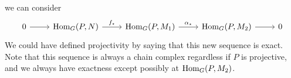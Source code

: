 we can consider
\[\begin{tikzcd}
	0 & {\Hom_G(P, N)} & {\Hom_G(P, M_1)} & {\Hom_G(P, M_2)} & 0
	\arrow[from=1-1, to=1-2]
	\arrow["{f_\star}", from=1-2, to=1-3]
	\arrow["{\alpha_\star}", from=1-3, to=1-4]
	\arrow[from=1-4, to=1-5]
\end{tikzcd}\]
We could have defined projectivity by saying that this new sequence is exact.
Note that this sequence is always a chain complex regardless if \( P \) is projective, and we always have exactness except possibly at \( \operatorname{Hom}_G(P, M_2) \).
